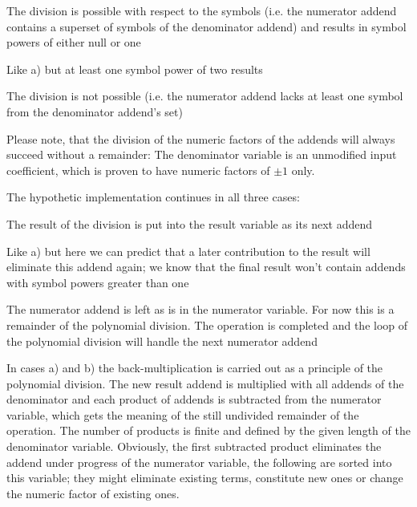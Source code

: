 \begin{compactenum}[a)]
  \item The division is possible with respect to the symbols (i.e. the
    numerator addend contains a superset of symbols of the denominator
    addend) and results in symbol powers of either null or one
  \item Like a) but at least one symbol power of two results
  \item The division is not possible (i.e. the numerator addend lacks
    at least one symbol from the denominator addend's set)
\end{compactenum}

Please note, that the division of the numeric factors of the addends will
always succeed without a remainder: The denominator variable is an
unmodified input coefficient, which is proven to have numeric factors
of $\pm 1$ only.

The hypothetic implementation continues in all three cases:
\begin{compactenum}[a)]
  \item The result of the division is put into the result variable as
    its next addend
  \item Like a) but here we can predict that a later contribution to
    the result will eliminate this addend again; we know that the final
    result won't contain addends with symbol powers greater than one
  \item The numerator addend is left as is in the numerator variable. For
    now this is a remainder of the polynomial division. The operation is
    completed and the loop of the polynomial division will handle the next
    numerator addend
\end{compactenum}

In cases a) and b) the back-multiplication is carried out as a principle
of the polynomial division. The new result addend is multiplied with all
addends of the denominator and each product of addends is subtracted from
the numerator variable, which gets the meaning of the still undivided
remainder of the operation. The number of products is finite and defined
by the given length of the denominator variable. Obviously, the first
subtracted product eliminates the addend under progress of the numerator
variable, the following are sorted into this variable; they might
eliminate existing terms, constitute new ones or change the numeric factor
of existing ones.

